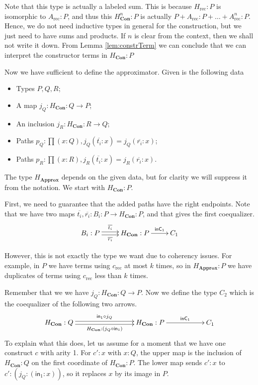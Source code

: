 \documentclass[a4paper,UKenglish]{lipics-v2016}
\newcommand{\Boperator}[1]{\mathsf{#1}}
\newcommand{\inn}{\Boperator{in}}
\newcommand{\rec}[0]{\operatorname{rec}}
\newcommand{\Con}[0]{\textbf{Con}}
\newcommand{\Approx}[0]{\textbf{Approx}}
\newcommand{\inC}[0]{\Boperator{inC}}
\begin{document}
Note that this type is actually a labeled sum.
This is because $H_{\rec} : P$ is isomorphic to $A_{\rec} : P$, and thus this $H_{\Con}^n : P$ is actually $P + A_{\rec} : P + \ldots + A_{\rec}^n : P$.
Hence, we do not need inductive types in general for the construction, but we just need to have sums and products.
If $n$ is clear from the context, then we shall not write it down.
From Lemma \ref{lem:constrTerm} we can conclude that we can interpret the constructor terms in $H_{\Con} : P$

Now we have sufficient to define the approximator.
Given is the following data
\begin{itemize}
        \item Types $P, Q, R$;
        \item A map $j_Q : H_{\Con} : Q \rightarrow P$;
        \item An inclusion $j_R : H_{\Con} : R \rightarrow Q$;
        \item Paths $p_Q : \prod (x : Q), j_Q(\overline{t_i} : x) = j_Q(\overline{r_i} : x)$;
        \item Paths $p_R : \prod (x : R), j_R(\overline{t_i} : x) = j_R(\overline{r_i} : x)$.
\end{itemize}
The type $H_{\Approx}$ depends on the given data, but for clarity we will suppress it from the notation.
We start with $H_{\Con} : P$.

First, we need to guarantee that the added paths have the right endpoints.
Note that we have two maps $\overline{t_i}, \overline{r_i} : B_i : P \rightarrow H_{\Con} : P$, and that gives the first coequalizer.
\[
\xymatrix
{
        B_i : P \ar@<-.5ex>[r]_-{\overline{r_i}} \ar@<.5ex>[r]^-{\overline{t_i}} & H_{\Con} : P \ar[r]^-{\inC_1} & C_1
}
\]

However, this is not exactly the type we want due to coherency issues.
For example, in $P$ we have terms using $c_{\rec}$ at most $k$ times, so in $H_{\Approx} : P$ we have duplicates of terms using $c_{\rec}$ less than $k$ times.

Remember that we we have $j_Q : H_{\Con} : Q \rightarrow P$.
Now we define the type $C_2$ which is the coequalizer of the following two arrows.
\[
\xymatrix
{
        H_{\Con} : Q \ar@<-.5ex>[rrr]_-{H_{\Con} : (j_Q \circ \inn_1)} \ar@<.5ex>[rrr]^-{\inn_1 \circ j_Q} & & & H_{\Con} : P \ar[rr]^-{\inC_1} & & C_1
}
\]
To explain what this does, let us assume for a moment that we have one construct $c$ with arity 1.
For $c' : x$ with $x : Q$, the upper map is the inclusion of $H_{\Con} : Q$ on the first coordinate of $H_{\Con} : P$.
The lower map sends $c' : x$ to $c' : (j_Q : (\inn_1 : x))$, so it replaces $x$ by its image in $P$.
\end{document}
